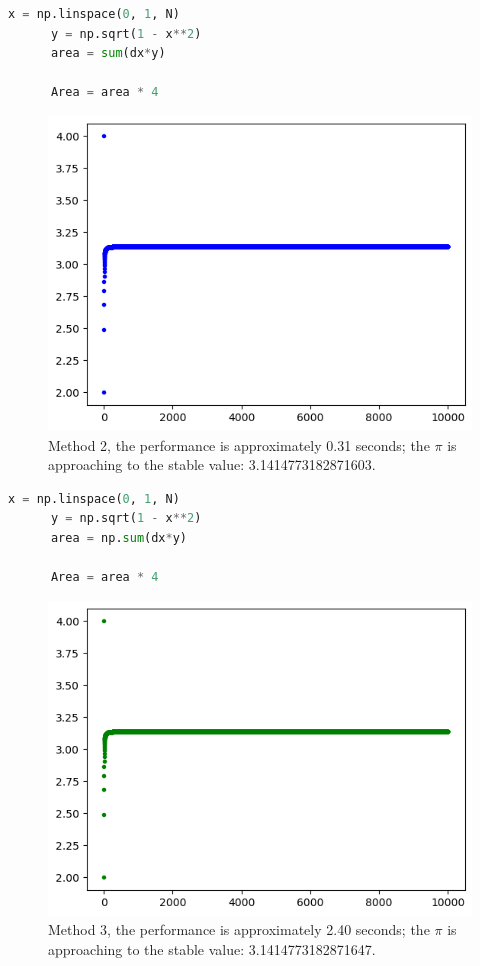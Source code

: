 \documentclass[12pt]{article}
\begin{document}
    \begin{lstlisting}[language={Python}, caption={Method 2, using default sum.}]
      x = np.linspace(0, 1, N)
      y = np.sqrt(1 - x**2)
      area = sum(dx*y)

      Area = area * 4
    \end{lstlisting}


    \begin{figure}[H]
      \centering 
      \includegraphics[width = 12cm]{fig3_per.png}
      \caption{Method 2, the performance is approximately 0.31 seconds; the $\pi$ is approaching to the stable value: 3.1414773182871603.\label{fig2_per}}
    \end{figure}

    \begin{lstlisting}[language={Python}, caption={Method 1, using {\ttfamily np.sum}.}]
      x = np.linspace(0, 1, N)
      y = np.sqrt(1 - x**2)
      area = np.sum(dx*y)

      Area = area * 4
    \end{lstlisting}

    \begin{figure}[H]
      \centering 
      \includegraphics[width = 12cm]{fig2_per.png}
      \caption{Method 3, the performance is approximately 2.40 seconds; the $\pi$ is approaching to the stable value: 3.1414773182871647.\label{fig3_per}}
    \end{figure}
\end{document}
